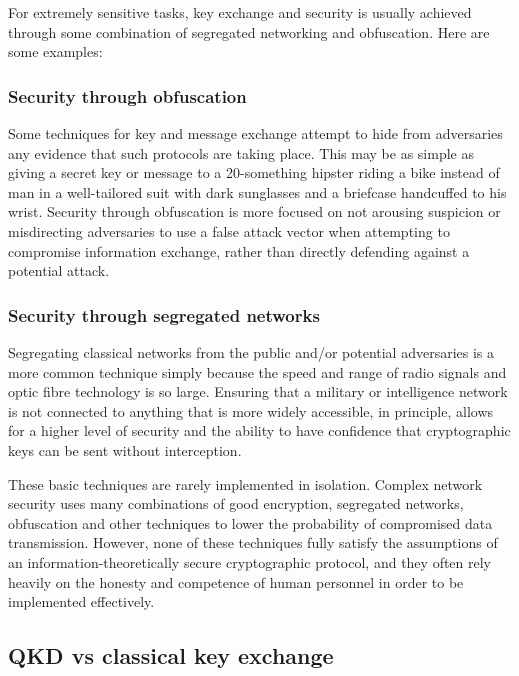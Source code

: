 \documentclass[twocolumn, aps, rmp, amsmath, amssymb, nofootinbib, superscriptaddress, longbibliography, floatfix, table-of-contents, eqsecnum]{revtex4-2}
\begin{document}
For extremely sensitive tasks, key exchange and security is usually achieved through some combination of segregated networking and obfuscation. Here are some examples: 

\subsubsection{Security through obfuscation}

Some techniques for key and message exchange attempt to hide from adversaries any evidence that such protocols are taking place. This may be as simple as giving a secret key or message to a 20-something hipster riding a bike instead of man in a well-tailored suit with dark sunglasses and a briefcase handcuffed to his wrist. Security through obfuscation is more focused on not arousing suspicion or misdirecting adversaries to use a false attack vector when attempting to compromise information exchange, rather than directly defending against a potential attack. 

\subsubsection{Security through segregated networks}

Segregating classical networks from the public and/or potential adversaries is a more common technique simply because the speed and range of radio signals and optic fibre technology is so large. Ensuring that a military or intelligence network is not connected to anything that is more widely accessible, in principle, allows for a higher level of security and the ability to have confidence that cryptographic keys can be sent without interception. 

These basic techniques are rarely implemented in isolation. Complex network security uses many combinations of good encryption, segregated networks, obfuscation and other techniques to lower the probability of compromised data transmission. However, none of these techniques fully satisfy the assumptions of an information-theoretically secure cryptographic protocol, and they often rely heavily on the honesty and competence of human personnel in order to be implemented effectively. 

\subsection{QKD vs classical key exchange}
\end{document}
